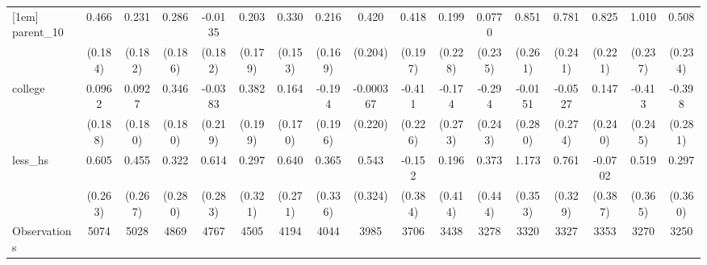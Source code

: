 {\begin{tabular}{l*{16}{c}}
[1em]
parent\_10           &       0.466\sym{*}  &       0.231         &       0.286         &     -0.0135         &       0.203         &       0.330\sym{*}  &       0.216         &       0.420\sym{*}  &       0.418\sym{*}  &       0.199         &      0.0770         &       0.851\sym{**} &       0.781\sym{**} &       0.825\sym{***}&       1.010\sym{***}&       0.508\sym{*}  \\
                    &     (0.184)         &     (0.182)         &     (0.186)         &     (0.182)         &     (0.179)         &     (0.153)         &     (0.169)         &     (0.204)         &     (0.197)         &     (0.228)         &     (0.235)         &     (0.261)         &     (0.241)         &     (0.221)         &     (0.237)         &     (0.234)         \\
[1em]
college             &      0.0962         &      0.0927         &       0.346         &     -0.0383         &       0.382         &       0.164         &      -0.194         &   -0.000367         &      -0.411         &      -0.174         &      -0.294         &     -0.0151         &     -0.0527         &       0.147         &      -0.413         &      -0.398         \\
                    &     (0.188)         &     (0.180)         &     (0.180)         &     (0.219)         &     (0.199)         &     (0.170)         &     (0.196)         &     (0.220)         &     (0.226)         &     (0.273)         &     (0.243)         &     (0.280)         &     (0.274)         &     (0.240)         &     (0.245)         &     (0.281)         \\
[1em]
less\_hs             &       0.605\sym{*}  &       0.455         &       0.322         &       0.614\sym{*}  &       0.297         &       0.640\sym{*}  &       0.365         &       0.543         &      -0.152         &       0.196         &       0.373         &       1.173\sym{***}&       0.761\sym{*}  &     -0.0702         &       0.519         &       0.297         \\
                    &     (0.263)         &     (0.267)         &     (0.280)         &     (0.283)         &     (0.321)         &     (0.271)         &     (0.336)         &     (0.324)         &     (0.384)         &     (0.414)         &     (0.444)         &     (0.353)         &     (0.329)         &     (0.387)         &     (0.365)         &     (0.360)         \\
\hline
Observations        &        5074         &        5028         &        4869         &        4767         &        4505         &        4194         &        4044         &        3985         &        3706         &        3438         &        3278         &        3320         &        3327         &        3353         &        3270         &        3250         \\

\end{tabular}}

